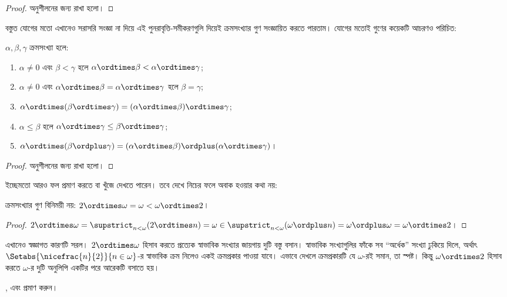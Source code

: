 \documentclass[../../../include/open-logic-section]{subfiles}
\begin{document}
\begin{proof}
অনুশীলনের জন্য রাখা হলো।
\end{proof}

বস্তুত যোগের মতো এখানেও সরাসরি সংজ্ঞা না দিয়ে
এই পুনরাবৃত্তি-সমীকরণগুলি দিয়েই ক্রমসংখ্যার গুণ
সংজ্ঞায়িত করতে পারতাম। যোগের মতোই গুণের কয়েকটি
আচরণও পরিচিত:

\begin{lem}
$\alpha, \beta, \gamma$ ক্রমসংখ্যা হলে:
\begin{enumerate}
	\item{} $\alpha \neq 0$ এবং
	$\beta < \gamma$ হলে $\alpha \ordtimes \beta
	< \alpha \ordtimes \gamma$;
	\item{} $\alpha \neq 0$ এবং
	$\alpha \ordtimes \beta = \alpha\ordtimes\gamma$
	হলে $\beta = \gamma$;
	\item{} $\alpha \ordtimes (\beta \ordtimes
	\gamma) = (\alpha \ordtimes \beta) \ordtimes \gamma$;
	\item{} $\alpha \leq \beta$ হলে
	$\alpha \ordtimes \gamma \leq \beta \ordtimes \gamma$;
	\item{} $\alpha \ordtimes (\beta \ordplus
	\gamma) = (\alpha \ordtimes \beta)\ordplus
	(\alpha\ordtimes \gamma)$।
\end{enumerate}
\end{lem}

\begin{proof}
অনুশীলনের জন্য রাখা হলো।
\end{proof}

ইচ্ছেমতো আরও ফল প্রমাণ করতে বা খুঁজে দেখতে পারেন।
তবে 
দেখে নিচের ফলে অবাক হওয়ার কথা নয়:

\begin{prop}
ক্রমসংখ্যার গুণ বিনিময়ী নয়:
$2 \ordtimes \omega = \omega < \omega \ordtimes 2$।
\end{prop}

\begin{proof}
$2 \ordtimes \omega = \supstrict_{n < \omega}
(2\ordtimes n) = \omega \in
\supstrict_{n < \omega}(\omega \ordplus n)
= \omega \ordplus \omega = \omega \ordtimes 2$।
\end{proof}
\noindent
এখানেও স্বজ্ঞাগত কারণটি সরল। $2 \ordtimes \omega$
হিসাব করতে প্রত্যেক স্বাভাবিক সংখ্যার জায়গায় দুটি
বস্তু বসান। স্বাভাবিক সংখ্যাগুলির ফাঁকে সব ``অর্ধেক''
সংখ্যা ঢুকিয়ে দিলে, অর্থাৎ
$\Setabs{\nicefrac{n}{2}}{n \in \omega}$-র
স্বাভাবিক ক্রম নিলেও একই ক্রমপ্রকার পাওয়া যাবে।
এভাবে দেখলে ক্রমপ্রকারটি যে $\omega$-রই সমান,
তা স্পষ্ট। কিন্তু $\omega \ordtimes 2$ হিসাব করতে
$\omega$-র দুটি অনুলিপি একটির পরে আরেকটি বসাতে হয়।

\begin{prob}
,
এবং
প্রমাণ করুন।
\end{prob}
\end{document}
